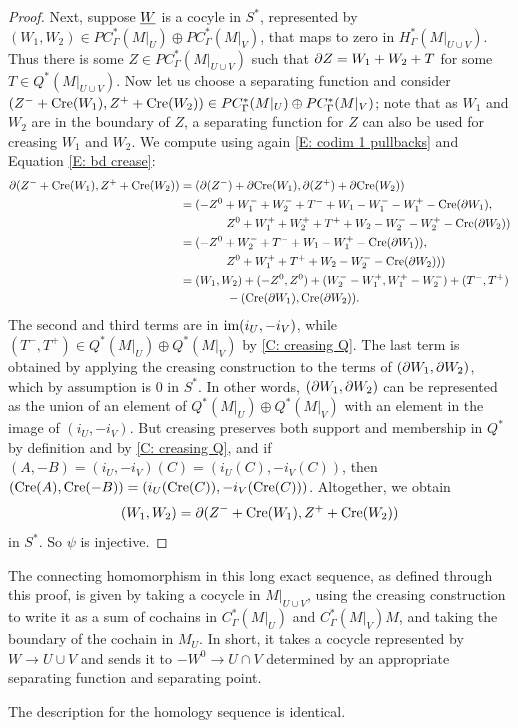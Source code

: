 \begin{proof}
	Next, suppose $\underline{W}$ is a cocyle in $S^*$, represented by $(W_1,W_2) \in PC^*_\Gamma(M|_U) \oplus PC^*_\Gamma(M|_V)$, that maps to zero in $H_{\Gamma}^*(M|_{U \cup V})$. Thus there is
	some $Z \in PC^*_\Gamma(M|_{U \cup V})$ such that $\partial Z = W_1+W_2+T$ for some $T \in Q^*(M|_{U \cup V})$.
	Now let us choose a separating function and consider $(Z^-+\mathrm{Cre}(W_1),Z^++\mathrm{Cre}(W_2)) \in PC^*_\Gamma(M|_U) \oplus PC^*_\Gamma(M|_V)$; note that as $W_1$ and $W_2$ are in the boundary of $Z$, a separating function for $Z$ can also be used for creasing $W_1$ and $W_2$. We compute using again \cref{E: codim 1 pullbacks} and Equation \eqref{E: bd crease}:
	\begin{align*}
		\partial (Z^-+\mathrm{Cre}(W_1),Z^++\mathrm{Cre}(W_2))& = (\partial (Z^-)+\partial \mathrm{Cre}(W_1),\partial (Z^+)+\partial\mathrm{Cre}(W_2))\\
		& = (-Z^0 + W_1^- + W_2^- + T^-+W_1 -W_1^- -W_1^+ -\mathrm{Cre}(\partial W_1),\\
		&\qquad\qquad Z^0+ W_1^++ W_2^+ + T^++W_2 -W_2^- -W_2^+ -\mathrm{Cre}(\partial W_2))\\
		& = (-Z^0 + W_2^- + T^-+W_1 -W_1^+ -\mathrm{Cre}(\partial W_1)),\\
		&\qquad\qquad Z^0+ W_1^+ + T^++W_2 -W_2^- -\mathrm{Cre}(\partial W_2)))\\
		& = (W_1,W_2)+ (-Z^0,Z^0) + (W_2^--W_1^+, W_1^+ -W_2^-) + (T^-,T^+)\\
		&\qquad\qquad -(\mathrm{Cre}(\partial W_1),\mathrm{Cre}(\partial W_2)).
	\end{align*}
	The second and third terms are in $\text{im}(i_U,-i_V)$, while $(T^-,T^+) \in Q^*(M|_U) \oplus Q^*(M|_V)$ by \cref{C: creasing Q}.
	The last term is obtained by applying the creasing construction to the terms of $(\partial W_1,\partial W_2)$, which by assumption is $0$ in $S^*$. In other words, $(\partial W_1,\partial W_2)$ can be represented as the union of an element of $Q^*(M|_U) \oplus Q^*(M|_V)$ with an element in the image of $(i_U,-i_V)$. But creasing preserves both support and membership in $Q^*$ by definition and by \cref{C: creasing Q}, and if $(A,-B) = (i_U,-i_V)(C) = (i_U(C),-i_V(C))$, then $(\mathrm{Cre}(A),\mathrm{Cre}(-B)) = (i_U(\mathrm{Cre}(C)),-i_V(\mathrm{Cre}(C)))$. Altogether, we obtain $$(W_1,W_2) = \partial (Z^-+\mathrm{Cre}(W_1),Z^++\mathrm{Cre}(W_2))$$ in $S^*$. So $\psi$ is injective.
\end{proof}

\begin{remark}\label{R: MV boundary}
	The connecting homomorphism in this long exact sequence, as defined through this proof, is given by taking a cocycle in $M|_{U \cup V}$,
	using the creasing construction to write it as a sum of cochains in $C^*_\Gamma(M|_{U})$ and $C^*_\Gamma(M|_{V})M$, and taking the boundary of the cochain in $M_U$.
	In short, it takes a cocycle represented by $W \to U \cup V$ and sends it to $-W^0 \to U \cap V$ determined by an appropriate separating function and separating point.

	The description for the homology sequence is identical.
\end{remark}


